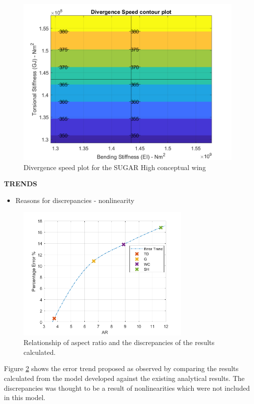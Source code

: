 \documentclass[11pt]{article}
\begin{document}
\begin{figure}[H]
    \centering
    \includegraphics[width = .7\textwidth]{figures/SUGAR_divergence.png}
    \caption{Divergence speed plot for the SUGAR High conceptual wing}
    \label{fig:SUGAR-divergence}
\end{figure}

\textbf{TRENDS}

\begin{itemize}
    \item Reasons for discrepancies - nonlinearity
\end{itemize}

\begin{figure}
    \centering
    \includegraphics[width = 8.5cm]{figures/error-trend.png}
    \caption{Relationship of aspect ratio and the discrepancies of the results calculated.}
    \label{fig:error}
\end{figure}

Figure \ref{fig:error} shows the error trend proposed as observed by comparing the results calculated from the model developed against the existing analytical results. The discrepancies was thought to be a result of nonlinearities which were not included in this model.
\end{document}

